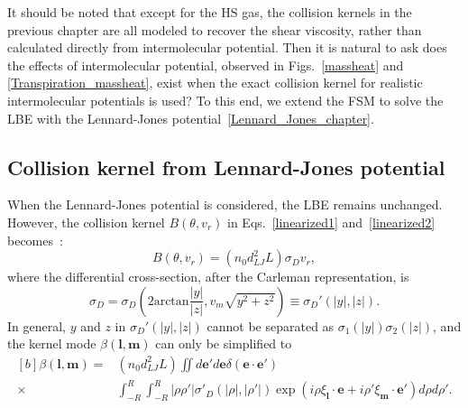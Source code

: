 It should be noted that except for the HS gas, the collision kernels in the previous  chapter are all modeled to recover the shear viscosity, rather than calculated directly from intermolecular potential. Then it is natural to ask does the effects of intermolecular potential, observed in Figs.~\ref{massheat} and \ref{Transpiration_massheat}, exist when the exact collision kernel for realistic intermolecular potentials is used? To this end, we extend the FSM to solve the LBE with the Lennard-Jones potential~\eqref{Lennard_Jones_chapter}. 


\subsection{Collision kernel from Lennard-Jones potential}\label{linear_LJ_FSM}

When the Lennard-Jones potential is considered, the LBE remains unchanged. However, the collision kernel $B(\theta,v_r)$ in Eqs.~\eqref{linearized1} and~\eqref{linearized2} becomes~\cite{wuPoF2015}:
\begin{equation}\label{LJ_collision_kernel}
B(\theta,v_r)=(n_0d_{LJ}^2L)\sigma_Dv_r,
\end{equation} 
where the differential cross-section, after the Carleman representation, is
\begin{equation}
\sigma_D=\sigma_D\left(2\text{arctan}\frac{|y|}{|z|},v_m\sqrt{y^2+z^2}\right)\equiv\sigma_D'(|y|,|z|).
\end{equation}
In general, $y$ and $z$ in $\sigma_D'(|y|,|z|)$ cannot be separated as $\sigma_1(|y|)\sigma_2(|z|)$, and the kernel mode 
$\beta(\bm{l},\bm{m})$ can only be simplified to
\begin{equation}\label{kernel_LJ_mode00}
\begin{aligned}[b]
\beta(\bm{l},\bm{m})=&(n_0d_{LJ}^2L)\iint {}d\bm{e}'d\bm{e} \delta(\bm{e}\cdot{\bm{e}'})\\
\times&
\int_{-R}^R\int_{-R}^R|\rho\rho'|\sigma'_D(|\rho|,|\rho'|)\exp(i\rho\xi_{\bm{l}}\cdot{\bm{e}}+i\rho'\xi_{\bm{m}}\cdot{\bm{e}'})d\rho d\rho'.
\end{aligned}
\end{equation}



